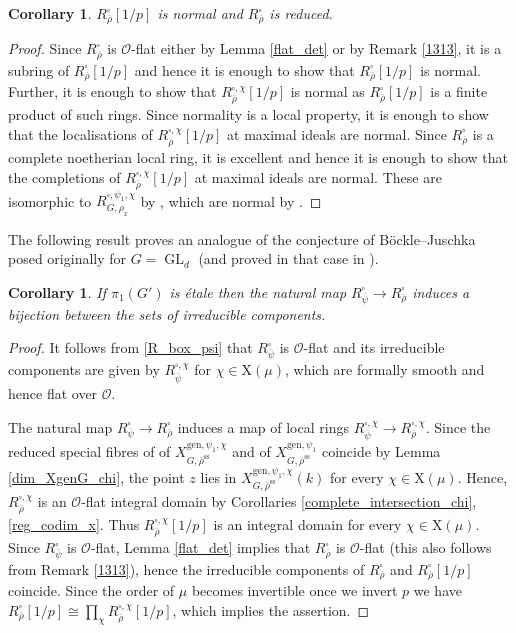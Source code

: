 \documentclass{amsart}
\newtheorem{cor}[prop]{Corollary}
\theoremstyle{definition}
\theoremstyle{remark}
\DeclareMathOperator{\GL}{GL}
\newcommand{\OO}{\mathcal O}
\newcommand{\rhobar}{\overline{\rho}}
\newcommand{\gen}{\mathrm{gen}}
\newcommand{\rhobarss}{\rhobar^{\mathrm{ss}}}
\newcommand{\psibar}{\overline{\psi}}
\begin{document}
\begin{cor}\label{R_norm_red} $R^{\square}_{\rhobar}[1/p]$ is normal and $R^{\square}_{\rhobar}$ is reduced. 
\end{cor} 
\begin{proof} Since $R^{\square}_{\rhobar}$ is $\OO$-flat either by Lemma \ref{flat_det} or by Remark \ref{1313}, it is a subring of $R^{\square}_{\rhobar}[1/p]$ and hence it is enough to show that $R^{\square}_{\rhobar}[1/p]$ is normal. Further, 
it is enough to show that $R^{\square, \chi}_{\rhobar}[1/p]$ is normal 
as $R^{\square}_{\rhobar}[1/p]$ is a 
finite product of such rings. Since normality is a local property, 
it is enough to show that the localisations of 
$R^{\square,\chi}_{\rhobar}[1/p]$ at maximal ideals are normal. 
Since $R^{\square}_{\rhobar}$ is a complete noetherian local ring, it is excellent and hence it is enough to show that the 
completions of $R^{\square, \chi}_{\rhobar}[1/p]$ at maximal ideals are normal. These are isomorphic to $R^{\square, \psi_1, \chi}_{G, \rho_x}$ by , which are normal by .
\end{proof}

The following result proves an analogue of the conjecture of B\"ockle--Juschka posed originally for $G=\GL_d$ (and proved in that case in \cite{BIP_new}). 
\begin{cor}\label{conj_BJ} If $\pi_1(G')$ is \'etale then the natural map $R^{\square}_{\psibar} \rightarrow R^{\square}_{\rhobar}$ induces a bijection between the 
sets of irreducible components. 
\end{cor}
\begin{proof} It follows from \eqref{R_box_psi} that 
$R^{\square}_{\psibar}$ is $\OO$-flat and its irreducible 
components are given by $R^{\square, \chi}_{\psibar}$ for $\chi\in \mathrm X(\mu)$, which are formally smooth and hence flat over $\OO$.

The natural map $R^{\square}_{\psibar} \rightarrow R^{\square}_{\rhobar}$
induces a map of local rings $R^{\square,\chi}_{\psibar} \rightarrow 
R^{\square,\chi}_{\rhobar}$. Since the reduced special fibres of 
of $X^{\gen,\psi_1,  \chi}_{G, \rhobarss}$ and of 
$X^{\gen, \psi_1}_{G, \rhobarss}$ coincide by Lemma \ref{dim_XgenG_chi}, 
the point $z$ lies in $X^{\gen,\psi_1,  \chi}_{G, \rhobarss}(k)$ for every 
$\chi\in \mathrm X(\mu)$. Hence, $R^{\square,\chi}_{\rhobar}$  is an $\OO$-flat integral domain by Corollaries \ref{complete_intersection_chi}, \ref{reg_codim_x}. 
Thus $R^{\square,\chi}_{\rhobar}[1/p]$ is an integral domain for every 
$\chi\in \mathrm X(\mu)$. Since $R^{\square}_{\psibar}$ is $\OO$-flat, 
Lemma \ref{flat_det} implies that $R^{\square}_{\rhobar}$ is $\OO$-flat 
(this also follows from Remark \ref{1313}), hence the 
irreducible components of $R^{\square}_{\rhobar}$ and $R^{\square}_{\rhobar}[1/p]$
coincide. Since the order of $\mu$ becomes invertible once we invert $p$ 
we have $R^{\square}_{\rhobar}[1/p]\cong \prod_{\chi} R^{\square, \chi}_{\rhobar}[1/p]$, which implies the assertion.
\end{proof}
\end{document}
